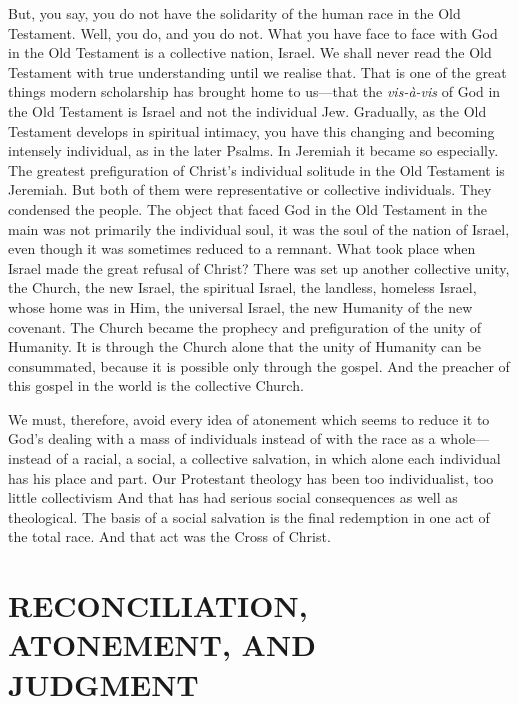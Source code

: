 \documentclass[12pt,letterpaper,oneside]{book}
\begin{document}
But, you say, you do not have the solidarity 
of the human race in the Old Testament. Well, 
you do, and you do not. What you have face to 
face with God in the Old Testament is a collective 
nation, Israel. We shall never read the 
Old Testament with true understanding until 
we realise that. That is one of the great things 
modern scholarship has brought home to us---that 
the \textit{vis-\`{a}-vis} of God in the Old Testament is 
Israel and not the individual Jew. Gradually, 
as the Old Testament develops in spiritual intimacy, 
you have this changing and becoming 
intensely individual, as in the later Psalms. In 
Jeremiah it became so especially. The greatest 
prefiguration of Christ's individual solitude in 
the Old Testament is Jeremiah. But both of 
them were representative or collective individuals. 
They condensed the people. The object 
that faced God in the Old Testament in the 
main was not primarily the individual soul, it 
was the soul of the nation of Israel, even 
though it was sometimes reduced to a remnant. 
What took place when Israel made the great 
refusal of Christ? There was set up another 
collective unity, the Church, the new Israel, the 
spiritual Israel, the landless, homeless Israel, 
whose home was in Him, the universal Israel, 
the new Humanity of the new covenant. The 
Church became the prophecy and prefiguration 
of the unity of Humanity. It is through the 
Church alone that the unity of Humanity can 
be consummated, because it is possible only 
through the gospel. And the preacher of this 
gospel in the world is the collective Church. 

We must, therefore, avoid every idea of atonement which seems to reduce it to God's dealing 
with a mass of individuals instead of with the 
race as a whole---instead of a racial, a social, a 
collective salvation, in which alone each individual has his place and part. Our Protestant 
theology has been too individualist, too little 
collectivism And that has had serious social 
consequences as well as theological. The basis 
of a social salvation is the final redemption in 
one act of the total race. And that act was the 
Cross of Christ. 



\chapter{RECONCILIATION, ATONEMENT, 
AND JUDGMENT} 
\end{document}
